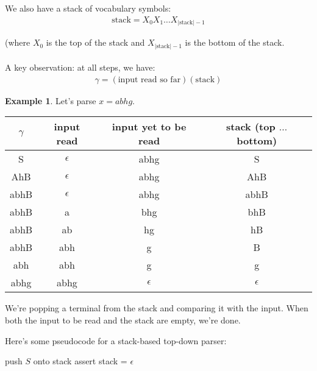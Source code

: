 \documentclass[]{article}
\theoremstyle{definition}
\newtheorem{ex}{Example}[section]
\begin{document}
				We also have a stack of vocabulary symbols:
				\begin{align*}
					\text{stack} = X_0X_1 \ldots X_{|\text{stack}|-1}
				\end{align*}

				(where $X_0$ is the top of the stack and $X_{|\text{stack}|-1}$ is the bottom of the stack.
				\\ \\
				A key observation: at all steps, we have:
				\begin{align*}
					\gamma = (\text{input read so far}) (\text{stack})
				\end{align*}

				\begin{ex}
					Let's parse $x = abhg$.
					\begin{center}
						\begin{tabular}{|c|c|c|c|}
							\hline
							$\gamma$ & input read & input yet to be read & stack (top $\ldots$ bottom) \\ \hline
							S & $\epsilon$ & abhg & S \\
							AhB & $\epsilon$ & abhg & AhB \\
							abhB & $\epsilon$ & abhg & abhB \\
							abhB & a & bhg & bhB \\
							abhB & ab & hg & hB \\
							abhB & abh & g & B \\
							abh & abh & g & g \\
							abhg & abhg & $\epsilon$ & $\epsilon$ \\ \hline
						\end{tabular}
					\end{center}

					We're popping a terminal from the stack and comparing it with the input. When both the input to be read and the stack are empty, we're done.
				\end{ex}

				Here's some pseudocode for a stack-based top-down parser:

				\begin{algorithm}[H]
					push $S$ onto stack\;
					assert stack = $\epsilon$\;
				\end{algorithm}
				
\end{document}
